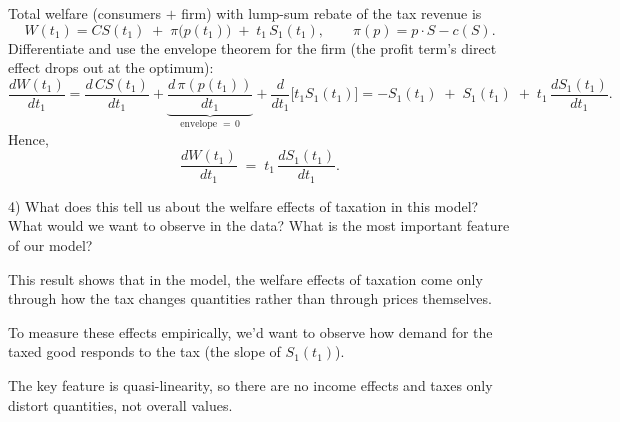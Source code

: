 \documentclass{article}
\begin{document}
Total welfare (consumers $+$ firm) with lump-sum rebate of the tax revenue is
\[
W(t_1)=CS(t_1)\;+\;\pi\big(p(t_1)\big)\;+\;t_1\,S_1(t_1),
\qquad
\pi(p)=p\cdot S-c(S).
\]
Differentiate and use the envelope theorem for the firm (the profit term’s direct effect
drops out at the optimum):
\[
\frac{dW(t_1)}{dt_1}
=\frac{d\,CS(t_1)}{dt_1}
+\underbrace{\frac{d\,\pi(p(t_1))}{dt_1}}_{\text{envelope }=\,0}
+\frac{d}{dt_1}\big[t_1 S_1(t_1)\big]
=-S_1(t_1)\;+\;S_1(t_1)\;+\;t_1\,\frac{dS_1(t_1)}{dt_1}.
\]
Hence,
\[
\frac{dW(t_1)}{dt_1}\;=\;t_1\,\frac{dS_1(t_1)}{dt_1}.
\]


\begin{tcolorbox}
4) What does this tell us about the welfare effects of taxation in this model? What would we want to observe in the data? What is the most important feature of our model?
\end{tcolorbox}

This result shows that in the model, the welfare effects of taxation come only through how the tax changes quantities rather than through prices themselves.

\vspace{5mm}

To measure these effects empirically, we’d want to observe how demand for the taxed good responds to the tax (the slope of $S_1(t_1)$).

\vspace{5mm}


The key feature is quasi-linearity, so there are no income effects and taxes only distort quantities, not overall values.
\end{document}
